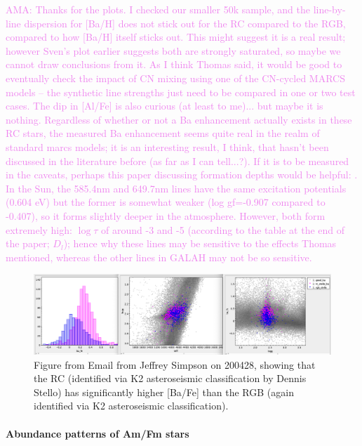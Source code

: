\documentclass[fleqn,usenatbib,useAMS]{mnras}
\newcommand\AMA[1]{\textcolor{violet}{AMA: #1}}
\begin{document}
\AMA{Thanks for the plots.  I checked our smaller 50k sample, and the line-by-line dispersion for [Ba/H] does not stick out for the RC compared to the RGB, compared to how [Ba/H] itself sticks out.  This might suggest it is a real result; however Sven's plot earlier suggests both are strongly saturated, so maybe we cannot draw conclusions from it. As I think Thomas said, it would be good to eventually check the impact of CN mixing using one of the CN-cycled MARCS models -- the synthetic line strengths just need to be compared in one or two test cases.  The dip in [Al/Fe] is also curious (at least to me)... but maybe it is nothing. Regardless of whether or not a Ba enhancement actually exists in these RC stars, the measured Ba enhancement seems quite real in the realm of standard marcs models; it is an interesting result, I think, that hasn't been discussed in the literature before (as far as I can tell...?).  If it is to be measured in the caveats, perhaps this paper discussing formation depths would be helpful: \citet{Gurtovenko2015}.  In the Sun, the 585.4nm and 649.7nm lines have the same excitation potentials (0.604 eV) but the former is somewhat weaker (log gf=-0.907 compared to -0.407), so it forms slightly deeper in the atmosphere.  However, both form extremely high: $\log \tau$ of around -3 and -5 (according to the table at the end of the paper; $D_{l}$); hence why these lines may be sensitive to the effects Thomas mentioned, whereas the other lines in GALAH may not be so sensitive.}

\begin{figure}
\centering
\includegraphics[width=\textwidth]{figures/Ba_RC_RGB.png}
\caption{Figure from Email from Jeffrey Simpson on 200428, showing that the RC (identified via K2 asteroseismic classification by Dennis Stello) has significantly higher [Ba/Fe] than the RGB (again identified via K2 asteroseismic classification).}
\label{fig:Ba_RC_RGB}
\end{figure}

\paragraph*{Abundance patterns of Am/Fm stars}
\end{document}
